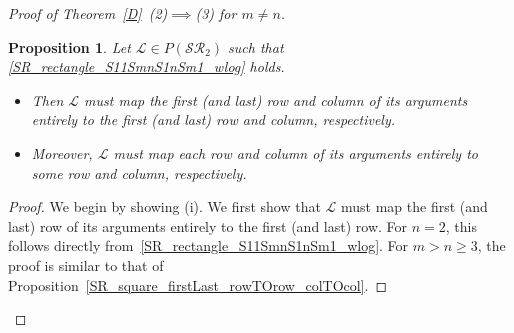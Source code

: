 \documentclass[11pt,reqno]{amsart}
\theoremstyle{plain}
\newtheorem{prop}[theorem]{Proposition}
\theoremstyle{definition}
\numberwithin{equation}{section}
\begin{document}
\begin{proof}[Proof of Theorem~\ref{D}~(2)$\implies$(3) for $m\neq n$]
	\begin{prop}\label{SR_rectangle_FirstLast_rowTorow_colTOcol}
		Let $\mathcal{L}\in P(\mathcal{SR}_2)$ such that \eqref{SR_rectangle_S11SmnS1nSm1_wlog} holds.
		\begin{itemize}
			\item[(i)] Then $\mathcal{L}$ must map the first (and last) row and column of its arguments entirely to the first (and last) row and column, respectively.
			
			\item[(ii)] Moreover, $\mathcal{L}$ must map each row and column of its arguments entirely to some row and column, respectively.
		\end{itemize}
	\end{prop}	
	\begin{proof}
		We begin by showing (i). We first show that $\mathcal{L}$ must map the first (and last) row of its arguments entirely to the first (and last) row. For $n=2$, this follows directly from~\eqref{SR_rectangle_S11SmnS1nSm1_wlog}. For $m>n\geq3$, the proof is similar to that of Proposition~\ref{SR_square_firstLast_rowTOrow_colTOcol}.
		

\end{proof}
\end{proof}
\end{document}
